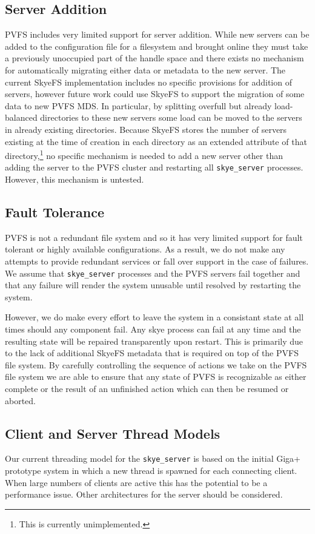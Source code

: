 \documentclass[twocolumn,letterpaper]{article}
\newcommand{\code}[1]{\texttt{#1}}
\begin{document}
\subsection{Server Addition}
PVFS includes very limited support for server addition.  While new servers can
be added to the configuration file for a filesystem and brought online they must
take a previously unoccupied part of the handle space and there exists no
mechanism for automatically migrating either data or metadata to the new server.
The current SkyeFS implementation includes no specific provisions for addition
of servers, however future work could use SkyeFS to support the migration of
some data to new PVFS MDS.  In particular, by splitting overfull but already
load-balanced directories to these new servers some load can be moved to the
servers in already existing directories.  Because SkyeFS stores the number of
servers existing at the time of creation in each directory as an extended
attribute of that directory,\footnote{This is currently unimplemented.} no
specific mechanism is needed to add a new server other than adding the server
to the PVFS cluster and restarting all \code{skye\_\-server} processes.  However,
this mechanism is untested.

\subsection{Fault Tolerance}
PVFS is not a redundant file system and so it has very limited support for fault
tolerant or highly available configurations.  As a result, we do not make any
attempts to provide redundant services or fall over support in the case of
failures.  We assume that \code{skye\_\-server} processes and the PVFS servers fail
together and that any failure will render the system unusable until resolved by
restarting the system.

However, we do make every effort to leave the system in a consistant state at
all times should any component fail.  Any skye process can fail at any time
and the resulting state will be repaired transparently upon restart.  This is
primarily due to the lack of additional SkyeFS metadata that is required on
top of the PVFS file system.  By carefully controlling the sequence of actions
we take on the PVFS file system we are able to ensure that any state of PVFS
is recognizable as either complete or the result of an unfinished action which
can then be resumed or aborted.

\subsection{Client and Server Thread Models}
Our current threading model for the \code{skye\_\-server} is based on the
initial Giga+ prototype system in which a new thread is spawned for each
connecting client.  When large numbers of clients are active this has the
potential to be a performance issue.  Other architectures for the server
should be considered. 
\end{document}
